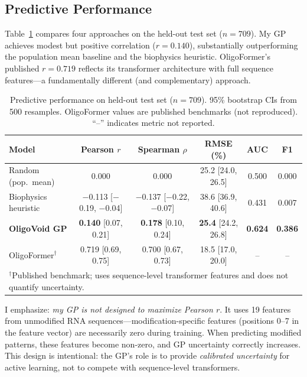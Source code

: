 \documentclass{article}
\begin{document}
\subsection{Predictive Performance}

Table~\ref{tab:prediction} compares four approaches on the held-out test set ($n=709$). My GP achieves modest but positive correlation ($r=0.140$), substantially outperforming the population mean baseline and the biophysics heuristic. OligoFormer's published $r=0.719$ reflects its transformer architecture with full sequence features---a fundamentally different (and complementary) approach.

\begin{table}[t]
\caption{Predictive performance on held-out test set ($n=709$). 95\% bootstrap CIs from 500 resamples. OligoFormer values are published benchmarks (not reproduced). ``--'' indicates metric not reported.}
\label{tab:prediction}
\centering
\small
\begin{tabular}{@{}lccccc@{}}
\toprule
\textbf{Model} & \textbf{Pearson $r$} & \textbf{Spearman $\rho$} & \textbf{RMSE (\%)} & \textbf{AUC} & \textbf{F1} \\
\midrule
Random (pop.\ mean) & 0.000 & 0.000 & 25.2 {\scriptsize [24.0, 26.5]} & 0.500 & 0.000 \\
Biophysics heuristic & $-$0.113 {\scriptsize [$-$0.19, $-$0.04]} & $-$0.137 {\scriptsize [$-$0.22, $-$0.07]} & 38.6 {\scriptsize [36.9, 40.6]} & 0.431 & 0.007 \\
\textbf{OligoVoid GP} & \textbf{0.140} {\scriptsize [0.07, 0.21]} & \textbf{0.178} {\scriptsize [0.10, 0.24]} & \textbf{25.4} {\scriptsize [24.2, 26.8]} & \textbf{0.624} & \textbf{0.386} \\
\midrule
OligoFormer$^\dagger$ & 0.719 {\scriptsize [0.69, 0.75]} & 0.700 {\scriptsize [0.67, 0.73]} & 18.5 {\scriptsize [17.0, 20.0]} & -- & -- \\
\bottomrule
\multicolumn{6}{l}{\scriptsize $^\dagger$Published benchmark; uses sequence-level transformer features and does not quantify uncertainty.}
\end{tabular}
\end{table}

I emphasize: \emph{my GP is not designed to maximize Pearson $r$}. It uses 19 features from unmodified RNA sequences---modification-specific features (positions 0--7 in the feature vector) are necessarily zero during training. When predicting modified patterns, these features become non-zero, and GP uncertainty correctly increases. This design is intentional: the GP's role is to provide \emph{calibrated uncertainty} for active learning, not to compete with sequence-level transformers.
\end{document}
